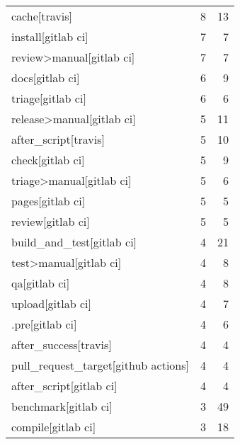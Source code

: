 \begin{tabular}{lrr}
cache[travis]                              &                   8 &            13 \\
install[gitlab ci]                         &                   7 &             7 \\
review>manual[gitlab ci]                   &                   7 &             7 \\
docs[gitlab ci]                            &                   6 &             9 \\
triage[gitlab ci]                          &                   6 &             6 \\
release>manual[gitlab ci]                  &                   5 &            11 \\
after\_script[travis]                       &                   5 &            10 \\
check[gitlab ci]                           &                   5 &             9 \\
triage>manual[gitlab ci]                   &                   5 &             6 \\
pages[gitlab ci]                           &                   5 &             5 \\
review[gitlab ci]                          &                   5 &             5 \\
build\_and\_test[gitlab ci]                  &                   4 &            21 \\
test>manual[gitlab ci]                     &                   4 &             8 \\
qa[gitlab ci]                              &                   4 &             8 \\
upload[gitlab ci]                          &                   4 &             7 \\
.pre[gitlab ci]                            &                   4 &             6 \\
after\_success[travis]                      &                   4 &             4 \\
pull\_request\_target[github actions]        &                   4 &             4 \\
after\_script[gitlab ci]                    &                   4 &             4 \\
benchmark[gitlab ci]                       &                   3 &            49 \\
compile[gitlab ci]                         &                   3 &            18 \\

\end{tabular}
